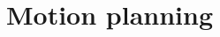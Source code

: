 \documentclass[../Head/Main.tex]{subfiles}
\begin{document}
\section{Motion planning}


\end{document}
